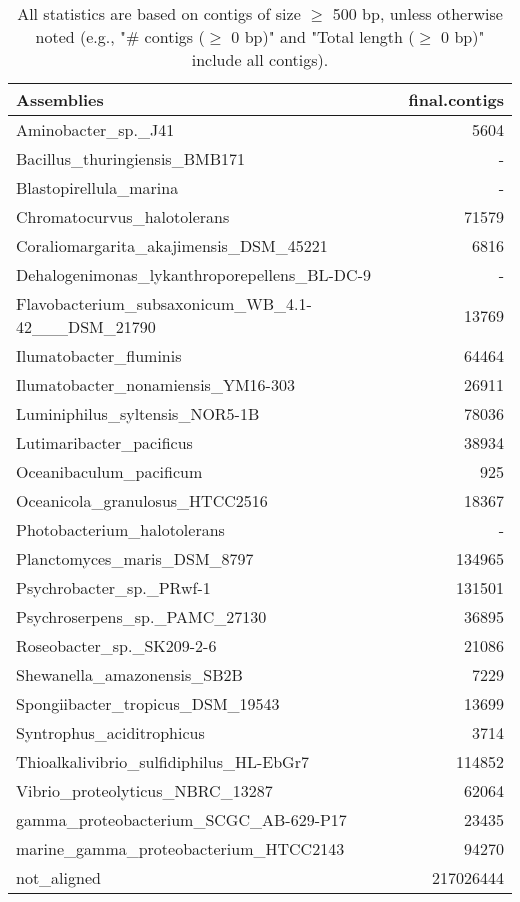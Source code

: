 \documentclass[12pt,a4paper]{article}
\begin{document}
\begin{table}[ht]
\begin{center}
\caption{All statistics are based on contigs of size $\geq$ 500 bp, unless otherwise noted (e.g., "\# contigs ($\geq$ 0 bp)" and "Total length ($\geq$ 0 bp)" include all contigs).}
\begin{tabular}{|l*{1}{|r}|}
\hline
Assemblies & final.contigs \\ \hline
Aminobacter\_sp.\_J41 & 5604 \\ \hline
Bacillus\_thuringiensis\_BMB171 & - \\ \hline
Blastopirellula\_marina & - \\ \hline
Chromatocurvus\_halotolerans & 71579 \\ \hline
Coraliomargarita\_akajimensis\_DSM\_45221 & 6816 \\ \hline
Dehalogenimonas\_lykanthroporepellens\_BL-DC-9 & - \\ \hline
Flavobacterium\_subsaxonicum\_WB\_4.1-42\_\_\_DSM\_21790 & 13769 \\ \hline
Ilumatobacter\_fluminis & 64464 \\ \hline
Ilumatobacter\_nonamiensis\_YM16-303 & 26911 \\ \hline
Luminiphilus\_syltensis\_NOR5-1B & 78036 \\ \hline
Lutimaribacter\_pacificus & 38934 \\ \hline
Oceanibaculum\_pacificum & 925 \\ \hline
Oceanicola\_granulosus\_HTCC2516 & 18367 \\ \hline
Photobacterium\_halotolerans & - \\ \hline
Planctomyces\_maris\_DSM\_8797 & 134965 \\ \hline
Psychrobacter\_sp.\_PRwf-1 & 131501 \\ \hline
Psychroserpens\_sp.\_PAMC\_27130 & 36895 \\ \hline
Roseobacter\_sp.\_SK209-2-6 & 21086 \\ \hline
Shewanella\_amazonensis\_SB2B & 7229 \\ \hline
Spongiibacter\_tropicus\_DSM\_19543 & 13699 \\ \hline
Syntrophus\_aciditrophicus & 3714 \\ \hline
Thioalkalivibrio\_sulfidiphilus\_HL-EbGr7 & 114852 \\ \hline
Vibrio\_proteolyticus\_NBRC\_13287 & 62064 \\ \hline
gamma\_proteobacterium\_SCGC\_AB-629-P17 & 23435 \\ \hline
marine\_gamma\_proteobacterium\_HTCC2143 & 94270 \\ \hline
not\_aligned & 217026444 \\ \hline
\end{tabular}
\end{center}
\end{table}
\end{document}
